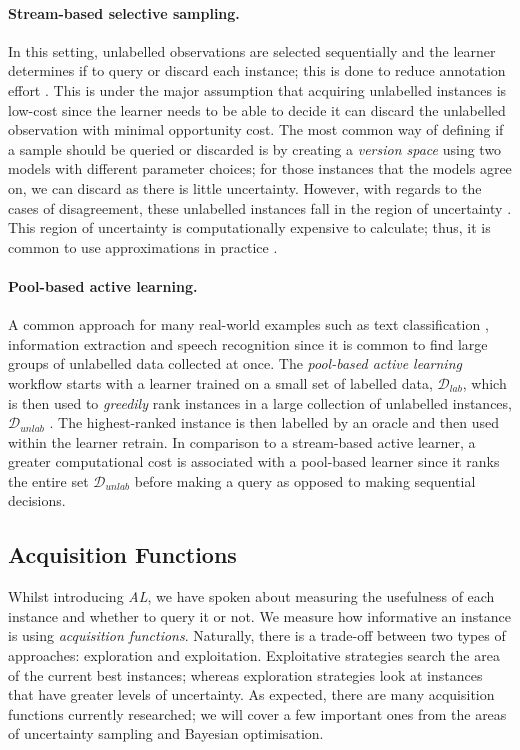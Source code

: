 \documentclass[ %
                    author={James Stephenson},
                supervisor={Dr. Edwin Simpson},
                    degree={MSc},
                     title={PROJECT PLAN},
                  subtitle={ Bayesian Deep Learning For Extractive Test Summarisation},
                      type={},
                      year={2022}]{../additions/dissertation}
\begin{document}
				\paragraph{Stream-based selective sampling.} In this setting, unlabelled observations are selected sequentially and the learner determines if to query or discard each instance; this is done to reduce annotation effort \cite{Cohn94}. This is under the major assumption that acquiring unlabelled instances is low-cost since the learner needs to be able to decide it can discard the unlabelled observation with minimal opportunity cost. The most common way of defining if a sample should be queried or discarded is by creating a \emph{version space} \cite{Mitchell82} using two models with different parameter choices; for those instances that the models agree on, we can discard as there is little uncertainty. However, with regards to the cases of disagreement, these unlabelled instances fall in the region of uncertainty \cite{Settles09}. This region of uncertainty is computationally expensive to calculate; thus, it is common to use approximations in practice \cite{Seung92, Cohn94, Dasgupta07}.

				\paragraph{Pool-based active learning.} A common approach for many real-world examples such as text classification \cite{Lewis94}, information extraction \cite{Thompson99} and speech recognition \cite{Tur05} since it is common to find large groups of unlabelled data collected at once. The \emph{pool-based active learning} workflow starts with a learner trained on a small set of labelled data, $ \mathcal{D}_{lab} $, which is then used to \emph{greedily} rank instances in a large collection of unlabelled instances, $\mathcal{D}_{unlab} $ \cite{Lewis94}. The highest-ranked instance is then labelled by an oracle and then used within the learner retrain. In comparison to a stream-based active learner, a greater computational cost is associated with a pool-based learner since it ranks the entire set $\mathcal{D}_{unlab}$ before making a query as opposed to making sequential decisions.
	
			\subsection{Acquisition Functions}
			\label{chap:literaturereview:active:acquisition}
		
				Whilst introducing \emph{AL}, we have spoken about measuring the usefulness of each instance and whether to query it or not. We measure how informative an instance is using \emph{acquisition functions}. Naturally, there is a trade-off between two types of approaches: exploration and exploitation. Exploitative strategies search the area of the current best instances; whereas exploration strategies look at instances that have greater levels of uncertainty. As expected, there are many acquisition functions currently researched; we will cover a few important ones from the areas of uncertainty sampling and Bayesian optimisation.
\end{document}
